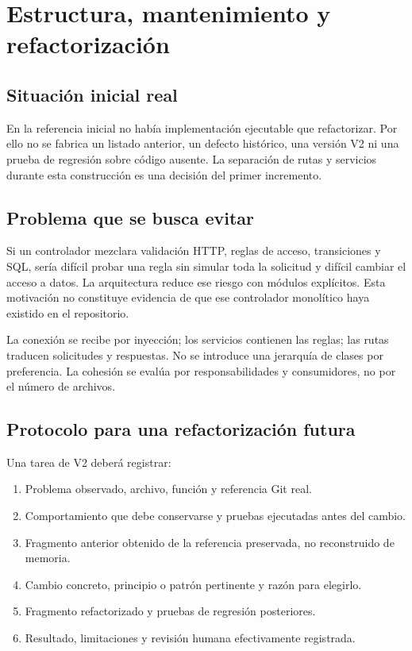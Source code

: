 \chapter{Estructura, mantenimiento y refactorización}
\section{Situación inicial real}
En la referencia inicial no había implementación ejecutable que refactorizar. Por ello no se fabrica un listado anterior, un defecto histórico, una versión V2 ni una prueba de regresión sobre código ausente. La separación de rutas y servicios durante esta construcción es una decisión del primer incremento.

\section{Problema que se busca evitar}
Si un controlador mezclara validación HTTP, reglas de acceso, transiciones y SQL, sería difícil probar una regla sin simular toda la solicitud y difícil cambiar el acceso a datos. La arquitectura reduce ese riesgo con módulos explícitos. Esta motivación no constituye evidencia de que ese controlador monolítico haya existido en el repositorio.

La conexión se recibe por inyección; los servicios contienen las reglas; las rutas traducen solicitudes y respuestas. No se introduce una jerarquía de clases por preferencia. La cohesión se evalúa por responsabilidades y consumidores, no por el número de archivos.

\section{Protocolo para una refactorización futura}
Una tarea de V2 deberá registrar:
\begin{enumerate}
  \item Problema observado, archivo, función y referencia Git real.
  \item Comportamiento que debe conservarse y pruebas ejecutadas antes del cambio.
  \item Fragmento anterior obtenido de la referencia preservada, no reconstruido de memoria.
  \item Cambio concreto, principio o patrón pertinente y razón para elegirlo.
  \item Fragmento refactorizado y pruebas de regresión posteriores.
  \item Resultado, limitaciones y revisión humana efectivamente registrada.
\end{enumerate}

